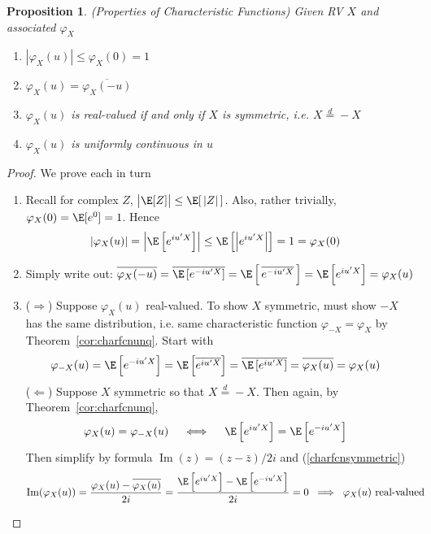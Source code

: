 \documentclass[12pt]{article}
\theoremstyle{plain}
\newtheorem{prop}[thm]{Proposition}
\theoremstyle{definition}
\theoremstyle{remark}
\renewcommand{\Im}{\operatorname{Im}}
\begin{document}
\begin{prop}\emph{(Properties of Characteristic Functions)}
Given RV $X$ and associated $\varphi_X$
\begin{enumerate}[label=\emph{(\roman*)}]
  \item $|\varphi_X(u)| \leq \varphi_X(0) = 1$
  \item $\varphi_X(u) = \overline{\varphi_X(-u)}$
  \item $\varphi_X(u)$ is real-valued if and only if $X$ is symmetric,
    i.e. $X \overset{d}{=} -X$
  \item $\varphi_X(u)$ is uniformly continuous in $u$
\end{enumerate}
\end{prop}
\begin{proof}
We prove each in turn
\begin{enumerate}[label=(\roman*)]
  \item Recall for complex $Z$, $\big|\E[Z]\big|\leq \E[\,|Z|\,]$.
    Also, rather trivially, $\varphi_X(0)=\E[e^{0}] = 1$.
    Hence
    \begin{align*}
      |\varphi_X(u)|
      =
      \left\lvert\E\left[e^{iu'X}\right]\right\rvert
      &\leq
      \E\left[\left\lvert e^{iu'X}\right\rvert\right]
      = 1 = \varphi_X(0)
    \end{align*}

  \item Simply write out:
    $\overline{\varphi_X(-u)}
    =
    \overline{\E\left[e^{-iu'X}\right]}
    =
    \E\left[\,\overline{e^{-iu'X}}\,\right]
    =
    \E\left[e^{iu'X}\right]
    =
    \varphi_X(u)$

  \item
    ($\Rightarrow$)
    Suppose $\varphi_X(u)$ real-valued. To show $X$ symmetric, must show
    $-X$ has the same distribution, i.e. same characteristic function
    $\varphi_{-X}=\varphi_X$ by Theorem~\ref{cor:charfcnunq}. Start with
    \begin{align*}
      \varphi_{-X}(u)
      =
      \E\left[e^{-iu'X}\right]
      =
      \E\left[\overline{e^{iu'X}}\right]
      &=
      \overline{\E\left[e^{iu'X}\right]}
      =
      \overline{\varphi_X(u)}
      = \varphi_X(u)
    \end{align*}
    ($\Leftarrow$)
    Suppose $X$ symmetric so that $X\overset{d}{=}-X$. Then
    again, by Theorem~\ref{cor:charfcnunq},
    \begin{align}
      \varphi_X(u)&=\varphi_{-X}(u)
      \quad\iff\quad
      \E\left[e^{iu'X}\right]
      = \E\left[e^{-iu'X}\right]
      \label{charfcnsymmetric}
    \end{align}
    Then simplify by formula $\Im(z) = (z - \bar{z})/2i$
    and (\ref{charfcnsymmetric})
    \begin{align*}
      \Im(\varphi_X(u))
      &=
      \frac{\varphi_X(u)-\overline{\varphi_X(u)}}{2i}
      =
      \frac{\E\left[e^{iu'X}\right]-\E\left[e^{-iu'X}\right]}{2i}
      =
      0
      \;\implies\;
      \text{$\varphi_X(u)$ real-valued}
    \end{align*}


\end{enumerate}
\end{proof}
\end{document}
